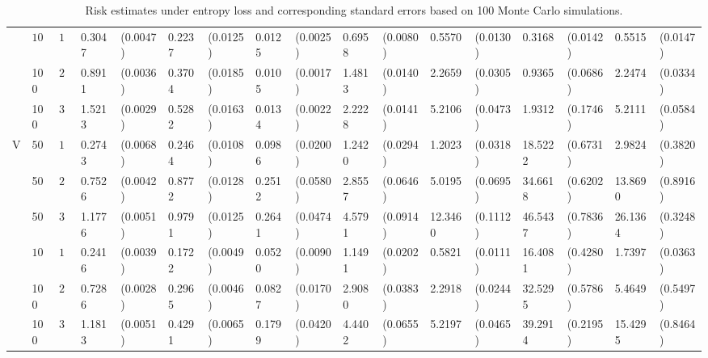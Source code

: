 \begin{landscape}
\begin{table}[H]
\begin{footnotesize}
\begin{tabular}{lllllllllllllllll}
    & $100$ & $10$ & 0.3047 & (0.0047) & 0.2237 & (0.0125) & 0.0125 & (0.0025) & 0.6958 & (0.0080) & 0.5570 & (0.0130) & 0.3168 & (0.0142) & 0.5515 & (0.0147) \\ 
    &  100 & $20$ & 0.8911 & (0.0036) & 0.3704 & (0.0185) & 0.0105 & (0.0017) & 1.4813 & (0.0140) & 2.2659 & (0.0305) & 0.9365 & (0.0686) & 2.2474 & (0.0334) \\ 
    & 100  & $30$ & 1.5213 & (0.0029) & 0.5282 & (0.0163) & 0.0134 & (0.0022) & 2.2228 & (0.0141) & 5.2106 & (0.0473) & 1.9312 & (0.1746) & 5.2111 & (0.0584) \\ 
  V & $50$ & $10$ & 0.2743 & (0.0068) & 0.2464 & (0.0108) & 0.0986 & (0.0200) & 1.2420 & (0.0294) & 1.2023 & (0.0318) & 18.5222 & (0.6731) & 2.9824 & (0.3820) \\ 
    &  50 & $20$ & 0.7526 & (0.0042) & 0.8772 & (0.0128) & 0.2512 & (0.0580) & 2.8557 & (0.0646) & 5.0195 & (0.0695) & 34.6618 & (0.6202) & 13.8690 & (0.8916) \\ 
    & 50  & $30$ & 1.1776 & (0.0051) & 0.9791 & (0.0125) & 0.2641 & (0.0474) & 4.5791 & (0.0914) & 12.3460 & (0.1112) & 46.5437 & (0.7836) & 26.1364 & (0.3248) \\ 
    & $100$ & $10$ & 0.2416 & (0.0039) & 0.1722 & (0.0049) & 0.0520 & (0.0090) & 1.1491 & (0.0202) & 0.5821 & (0.0111) & 16.4081 & (0.4280) & 1.7397 & (0.0363) \\ 
    &  100 & $20$ & 0.7286 & (0.0028) & 0.2965 & (0.0046) & 0.0827 & (0.0170) & 2.9080 & (0.0383) & 2.2918 & (0.0244) & 32.5295 & (0.5786) & 5.4649 & (0.5497) \\ 
    & 100  & $30$ & 1.1813 & (0.0051) & 0.4291 & (0.0065) & 0.1799 & (0.0420) & 4.4402 & (0.0655) & 5.2197 & (0.0465) & 39.2914 & (0.2195) & 15.4295 & (0.8464) \\ 
   \hline
\end{tabular}
\end{footnotesize}
\caption{Risk estimates under entropy loss and corresponding standard errors based on
                              100 Monte Carlo simulations.} \label{table:master-entropy-risk-table}
\end{table}

\end{landscape}


